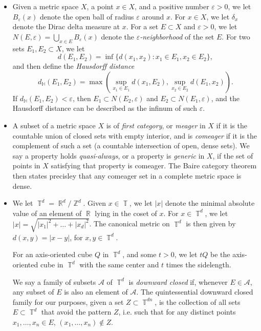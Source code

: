 \documentclass[dvipsnames,letterpaper,12pt]{article}
\numberwithin{equation}{section}
\DeclareMathOperator{\RR}{\mathbb{R}}
\DeclareMathOperator{\ZZ}{\mathbb{Z}}
\DeclareMathOperator{\TT}{\mathbb{T}}
\numberwithin{theorem}{section}
\begin{document}
\begin{itemize}

    \item Given a metric space $X$, a point $x \in X$, and a positive number $\varepsilon > 0$, we let $B_\varepsilon(x)$ denote the open ball of radius $\varepsilon$ around $x$. For $x \in X$, we let $\delta_x$ denote the Dirac delta measure at $x$. For a set $E \subset X$ and $\varepsilon > 0$, we let $N(E,\varepsilon) = \bigcup_{x \in E} B_\varepsilon(x)$ denote the \emph{$\varepsilon$-neighborhood} of the set $E$. For two sets $E_1,E_2 \subset X$, we let
    \[ d(E_1,E_2) = \inf \{ d(x_1,x_2) : x_1 \in E_1, x_2 \in E_2 \}, \]
    and then define the \emph{Hausdorff distance}
    \[ d_{\mathbb{H}}(E_1,E_2) = \max \left( \sup_{x_1 \in E_1} d(x_1,E_2), \sup_{x_2 \in E_2} d(E_1,x_2) \right). \]
    If $d_{\mathbb{H}}(E_1,E_2) < \varepsilon$, then $E_1 \subset N(E_2,\varepsilon)$ and $E_2 \subset N(E_1,\varepsilon)$, and the Hausdorff distance can be described as the infinum of such $\varepsilon$.

    \item A subset of a metric space $X$ is of \emph{first category}, or \emph{meager} in $X$ if it is the countable union of closed sets with empty interior, and is \emph{comeager} if it is the complement of such a set (a countable intersection of open, dense sets). We say a property holds \emph{quasi-always}, or a property is \emph{generic} in $X$, if the set of points in $X$ satisfying that property is comeager. The Baire category theorem then states precisley that any comeager set in a complete metric space is dense.

    \item We let $\TT^d = \RR^d/\ZZ^d$. Given $x \in \TT$, we let $|x|$ denote the minimal absolute value of an element of $\RR$ lying in the coset of $x$. For $x \in \TT^d$, we let $|x| = \sqrt{|x_1|^2 + \dots + |x_d|^2}$. The canonical metric on $\TT^d$ is then given by $d(x,y) = |x - y|$, for $x,y \in \TT^d$.

    For an axis-oriented cube $Q$ in $\TT^d$, and some $t > 0$, we let $tQ$ be the axis-oriented cube in $\TT^d$ with the same center and $t$ times the sidelength.

    We say a family of subsets $\mathcal{A}$ of $\TT^d$ is \emph{downward closed} if, whenever $E \in \mathcal{A}$, any subset of $E$ is also an element of $\mathcal{A}$. The quintessential downward closed family for our purposes, given a set $Z \subset \TT^{dn}$, is the collection of all sets $E \subset \TT^d$ that avoid the pattern $Z$, i.e. such that for any distinct points $x_1,\dots,x_n \in E$, $(x_1,\dots,x_n) \not \in Z$.


\end{itemize}
\end{document}
